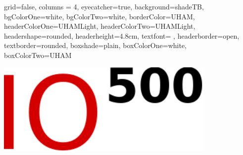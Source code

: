 \documentclass[portrait,a0paper,fontscale=0.4]{baposter}
\begin{document}



\begin{poster}
{ %
  grid=false,
  columns = 4,
  eyecatcher=true,
  background=shadeTB,%
  bgColorOne=white,
  bgColorTwo=white,
  borderColor=UHAM,
  headerColorOne=UHAMLight,
  headerColorTwo=UHAMLight,%
  headershape=rounded,
  headerheight=4.8cm,
  textfont={\setlength{\parindent}{0em} \setlength{\parskip}{0.75em}},
  headerborder=open,
  textborder=rounded,
  boxshade=plain,%
  boxColorOne=white,
  boxColorTwo=UHAM
}{ %
  \begin{minipage}{0.2\textwidth}
   \begin{center}
    \includegraphics[width=0.8\textwidth]{logo-io500.pdf}
   \end{center}
  \end{minipage}

}
\end{poster}
\end{document}

